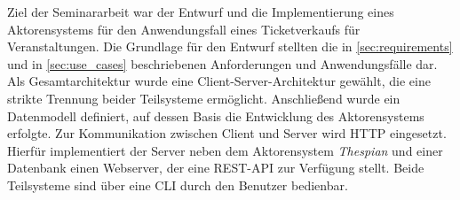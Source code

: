 Ziel der Seminararbeit war der Entwurf und die Implementierung eines Aktorensystems für den Anwendungsfall eines Ticketverkaufs für Veranstaltungen.
Die Grundlage für den Entwurf stellten die in \autoref{sec:requirements} und in \autoref{sec:use_cases} beschriebenen Anforderungen und Anwendungsfälle dar.
Als Gesamtarchitektur wurde eine Client-Server-Architektur gewählt, die eine strikte Trennung beider Teilsysteme ermöglicht.
Anschließend wurde ein Datenmodell definiert, auf dessen Basis die Entwicklung des Aktorensystems erfolgte.
Zur Kommunikation zwischen Client und Server wird \ac{HTTP} eingesetzt.
Hierfür implementiert der Server neben dem Aktorensystem \textit{Thespian} und einer Datenbank einen Webserver, der eine \ac{REST}-\ac{API} zur Verfügung stellt.
Beide Teilsysteme sind über eine \ac{CLI} durch den Benutzer bedienbar.
